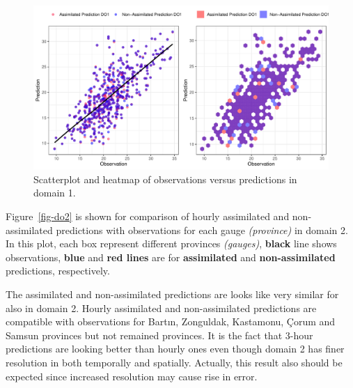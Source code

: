 \documentclass[
  letterpaper,
  DIV=11,
  numbers=noendperiod,
  abstract]{scrartcl}
\begin{document}
\begin{figure}[H]

{\centering \includegraphics{WRF_pdf_files/figure-pdf/fig-sc1-1.pdf}

}

\caption{\label{fig-sc1}Scatterplot and heatmap of observations versus
predictions in domain 1.}

\end{figure}

Figure~\ref{fig-do2} is shown for comparison of hourly assimilated and
non-assimilated predictions with observations for each gauge
\emph{(province)} in domain 2. In this plot, each box represent
different provinces \emph{(gauges)}, \textbf{black} line shows
observations, \textbf{blue} and \textbf{red lines} are for
\textbf{assimilated} and \textbf{non-assimilated} predictions,
respectively.

The assimilated and non-assimilated predictions are looks like very
similar for also in domain 2. Hourly assimilated and non-assimilated
predictions are compatible with observations for Bartın, Zonguldak,
Kastamonu, Çorum and Samsun provinces but not remained provinces. It is
the fact that 3-hour predictions are looking better than hourly ones
even though domain 2 has finer resolution in both temporally and
spatially. Actually, this result also should be expected since increased
resolution may cause rise in error.
\end{document}
